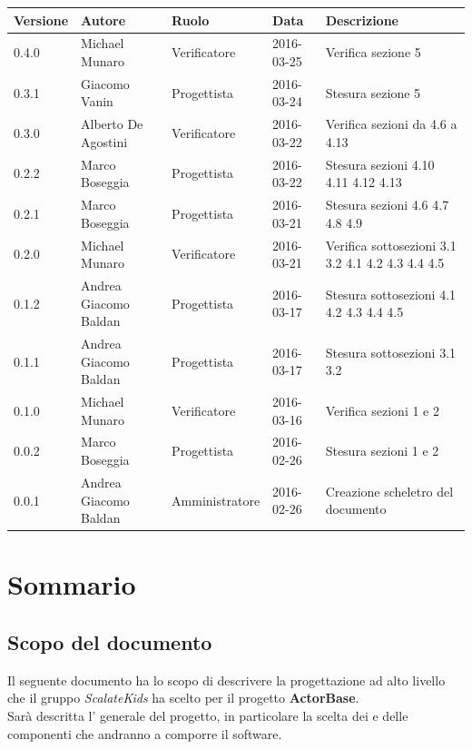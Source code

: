 \documentclass{scalatekids-article}
\begin{document}
\begin{center}
  \begin{tabular}{| l | l | l | l | p{5cm} |}
    \hline
    Versione & Autore & Ruolo & Data & Descrizione \\
    \hline
    0.4.0 & Michael Munaro & Verificatore & 2016-03-25 & Verifica sezione 5\\
    \hline
    0.3.1 & Giacomo Vanin & Progettista & 2016-03-24 & Stesura sezione 5\\
    \hline
    0.3.0 & Alberto De Agostini & Verificatore & 2016-03-22 & Verifica sezioni da 4.6 a 4.13\\
    \hline
    0.2.2 & Marco Boseggia & Progettista & 2016-03-22 & Stesura sezioni 4.10 4.11 4.12 4.13\\
    \hline
    0.2.1 & Marco Boseggia & Progettista & 2016-03-21 & Stesura sezioni 4.6 4.7 4.8 4.9\\
    \hline
    0.2.0 & Michael Munaro & Verificatore & 2016-03-21 & Verifica sottosezioni 3.1 3.2 4.1 4.2 4.3 4.4 4.5\\
    \hline
    0.1.2 & Andrea Giacomo Baldan & Progettista & 2016-03-17 & Stesura sottosezioni 4.1 4.2 4.3 4.4 4.5\\
    \hline
    0.1.1 & Andrea Giacomo Baldan & Progettista & 2016-03-17 & Stesura sottosezioni 3.1 3.2\\
    \hline
    0.1.0 & Michael Munaro & Verificatore & 2016-03-16 & Verifica sezioni 1 e 2\\
    \hline
    0.0.2 & Marco Boseggia & Progettista & 2016-02-26 & Stesura sezioni 1 e 2\\
    \hline
    0.0.1 & Andrea Giacomo Baldan & Amministratore & 2016-02-26 & Creazione scheletro del documento\\
    \hline
  \end{tabular}
\end{center}
\newpage
\tableofcontents
\newpage
{}

\section{Sommario}

\subsection{Scopo del documento}

Il seguente documento ha lo scopo di descrivere la progettazione ad alto livello
che il gruppo \textit{ScalateKids} ha scelto per il
progetto \textbf{ActorBase}.\\  Sarà descritta l' generale
del progetto, in particolare  la scelta dei  e delle
componenti che andranno a comporre il software.
\end{document}
